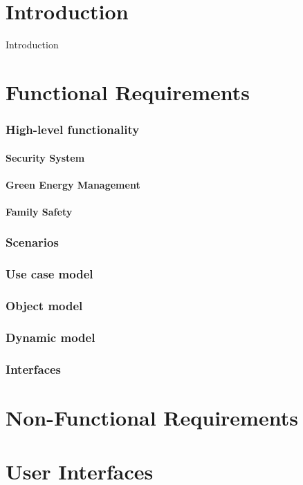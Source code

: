 \documentclass{report}
\begin{document}
\chapter{Introduction}

Introduction

\chapter{Functional Requirements}

\subsection{High-level functionality}

\subsubsection{Security System}



\subsubsection{Green Energy Management}



\subsubsection{Family Safety}



\subsection{Scenarios}



\subsection{Use case model}



\subsection{Object model}



\subsection{Dynamic model}



\subsection{Interfaces}

\chapter{Non-Functional Requirements}

\chapter{User Interfaces}
\end{document}
